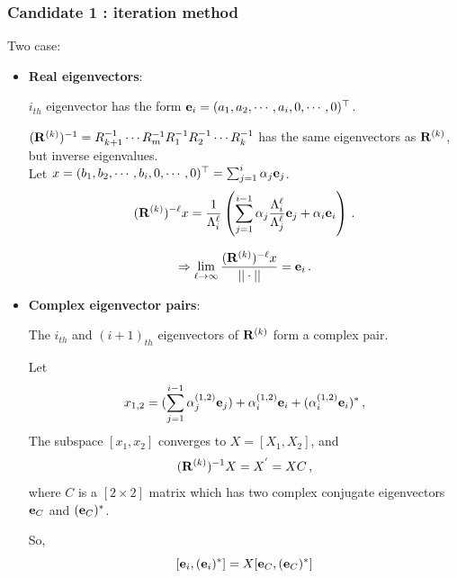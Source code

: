 \documentclass[mathserif, handout]{beamer}
\begin{document}
\begin{frame}[allowframebreaks]
  \frametitle{Candidate 1 : iteration method}

  Two case:
  \begin{itemize}
  \item \textbf{Real eigenvectors}:
  
    $i_{th}$ eigenvector has the form
    $\jEigvec[i]=(a_{1},a_{2},\cdots,a_{i},0,\cdots, 0)^\top $.
    
    $(\ps{R}{k})^{-1}=R_{k+1}^{-1}\cdots R_{m}^{-1}R_{1}^{-1}R_{2}^{-1}\cdots
    R_{k}^{-1}$ has the same eigenvectors as $\ps{R}{k}$, but inverse
    eigenvalues.
    \vspace{1em} \\
    Let $x=(b_{1},b_{2},\cdots,b_{i},0,\cdots, 0)^\top
    =\sum_{j=1}^{i}\alpha_{j}\jEigvec[j]$.
    \[
    (\ps{R}{k})^{-\ell}x
    =\frac{1}{\ExpaEig_{i}^{\ell}}
    \left(
      \sum_{j=1}^{i-1}
      \alpha_{j}\frac{\ExpaEig_{i}^{\ell}}{\ExpaEig_{j}^{\ell}}\jEigvec[j]+ 
      \alpha_{i}\jEigvec[i]
    \right)
    \,.
    \]

    \[
    \Rightarrow
    \lim_{\ell\to \infty} \frac{(\ps{R}{k})^{-\ell}x}{||\cdot||}=\jEigvec[i]
    \,.
    \]

  \item \textbf{Complex eigenvector pairs}:

    The $i_{th}$ and $(i+1)_{th}$ eigenvectors of $\ps{R}{k}$ form a
    complex pair.
    
    Let
    \[ 
    x_{1,2}=(\sum_{j=1}^{i-1}\alpha^{(1,2)}_{j}\jEigvec[j])+
    \alpha^{(1,2)}_{i}\jEigvec[i]+
    (\alpha^{(1,2)}_{i}\jEigvec[i])^{*}
    \,,
    \]
    The subspace $[x_1, x_2]$ converges to $X=[X_{1},X_{2}]$, and 
    \[
      (\ps{R}{k})^{-1}X=X^{'}=XC
      \,,
      \label{eq:similar}
    \]
    where $C$ is a $[2\!\times\! 2]$ matrix which has two complex conjugate
    eigenvectors $\jEigvec[C]$ and $(\jEigvec[C])^{*}$.
    
    So,
    \[
    [\jEigvec[i],(\jEigvec[i])^{*}]=X[\jEigvec[C],(\jEigvec[C])^{*}]
    \]
  \end{itemize}

\end{frame}
\end{document}
